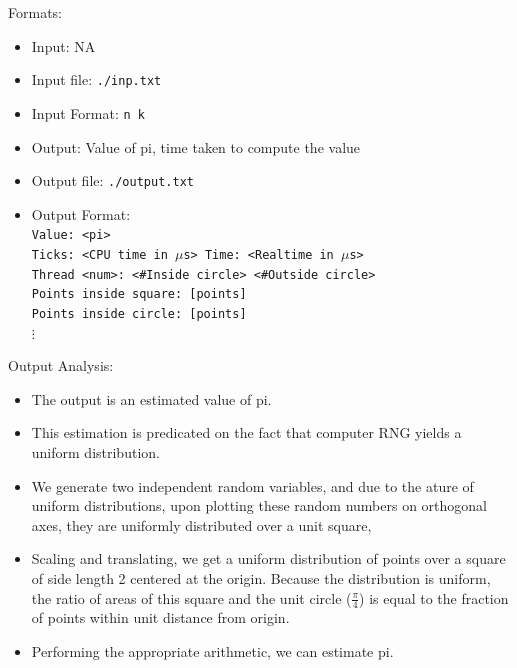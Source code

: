 \documentclass{amsart}           %
\begin{document}
    Formats:
    \begin{itemize}
       \item Input: NA
       \item Input file: \texttt{./inp.txt}
       \item Input Format: \texttt{n k}
       \item Output: Value of pi, time taken to compute the value
       \item Output file: \texttt{./output.txt}
       \item Output Format: \texttt{\\
        Value: <pi> \\
        Ticks: <CPU time in $\mu$s>
        Time: <Realtime in $\mu$s>\\
        Thread <num>: <\#Inside circle> <\#Outside circle>\\
        Points inside square: [points] \\
        Points inside circle: [points] \\
        $\vdots$
    }
    \end{itemize}

    Output Analysis:
    \begin{itemize}
        \item The output is an estimated value of pi. 
        \item This estimation is predicated on the fact that computer RNG yields a uniform distribution.
        \item We generate two independent random variables, and due to the ature of uniform distributions, upon plotting these random numbers on orthogonal axes, they are uniformly distributed over a unit square,
        \item Scaling and translating, we get a uniform distribution of points over a square of side length 2 centered at the origin. Because the distribution is uniform, the ratio of areas of this square and the unit circle ($\frac{\pi}{4}$) is equal to the fraction of points within unit distance from origin.
        \item Performing the appropriate arithmetic, we can estimate pi.
    \end{itemize}
\end{document}
